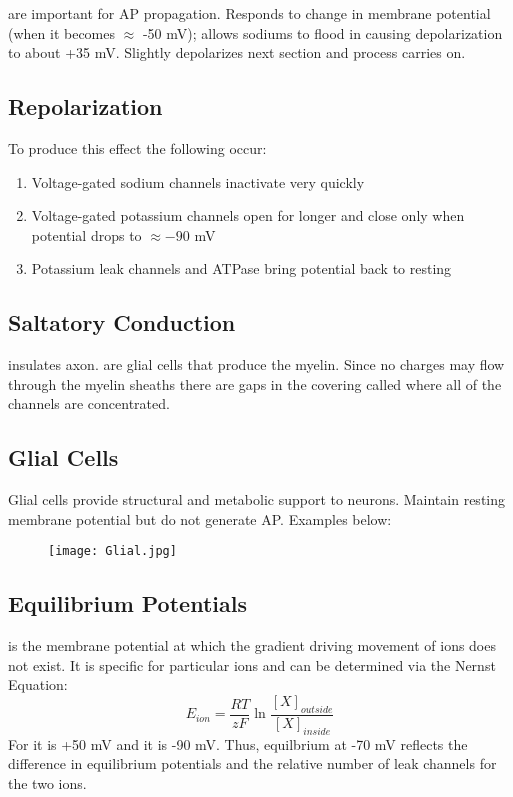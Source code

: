 \documentclass[../Psych_Soci_review.tex]{subfiles}
\begin{document}
 are important for AP propagation. Responds
to change in membrane potential (when it becomes $ \approx $ -50 mV); allows
sodiums to flood in causing depolarization to about +35 mV. Slightly depolarizes
next section and process carries on.

\subsection{Repolarization}

To produce this effect the following occur:
\begin{enumerate}
  \item Voltage-gated sodium channels inactivate very quickly
  \item Voltage-gated potassium channels open for longer and close only when
    potential drops to $ \approx -90 $ mV
  \item Potassium leak channels and ATPase bring potential back to resting
\end{enumerate}

\subsection{Saltatory Conduction}

 insulates axon.  are glial cells that
produce the myelin. Since no charges may flow through the myelin sheaths there
are gaps in the covering called  where all of the
channels are concentrated.

\subsection{Glial Cells}

Glial cells provide structural and metabolic support to neurons. Maintain
resting membrane potential but do not generate AP. Examples below:

\begin{figure}[h]
  \centering
  \texttt{[image: Glial.jpg]}
\end{figure}

\subsection{Equilibrium Potentials}

 is the membrane potential at which the gradient
driving movement of ions does not exist. It is specific for particular ions and
can be determined via the Nernst Equation:
\[ E_{ion} = \dfrac{RT}{zF}\ln
  \dfrac{\left[X\right]_{outside}}{\left[X\right]_{inside}} \]
For  it is +50 mV and  it is -90 mV. Thus,
equilbrium at -70 mV reflects the difference in equilibrium potentials and the
relative number of leak channels for the two ions.
\end{document}
